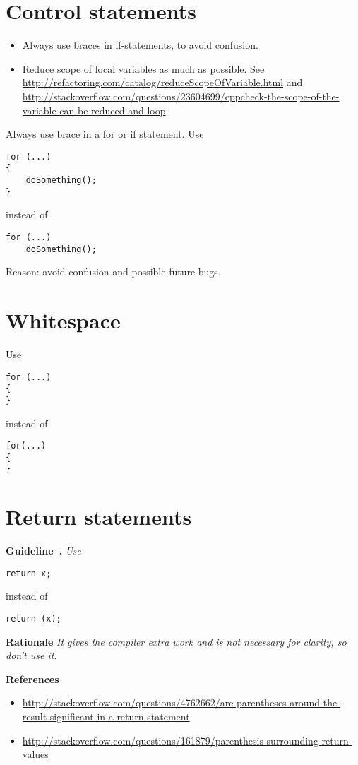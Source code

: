 \documentclass{article}
\newcounter{guideline}
\newenvironment{guideline}[1][]{\refstepcounter{guideline}\par\medskip
   \noindent \textbf{Guideline~\theguideline. #1} \em \rmfamily}{\medskip}
\newenvironment{rationale}{\par\medskip
   \noindent \textbf{Rationale} \em \rmfamily}{\medskip}
\newenvironment{references}{\par\medskip
   \noindent \textbf{References} \em \rmfamily \begin{itemize}}{\end{itemize}\medskip}
\begin{document}
\section{Control statements}

\begin{itemize}
\item Always use braces in if-statements, to avoid confusion.
\item Reduce scope of local variables as much as possible.  See \url{http://refactoring.com/catalog/reduceScopeOfVariable.html} and \url{http://stackoverflow.com/questions/23604699/cppcheck-the-scope-of-the-variable-can-be-reduced-and-loop}.
\end{itemize}

Always use brace in a for or if statement.  Use
\begin{lstlisting}
for (...)
{
    doSomething();
}
\end{lstlisting}
instead of
\begin{lstlisting}
for (...)
    doSomething();
\end{lstlisting}
Reason: avoid confusion and possible future bugs.

\section{Whitespace}
Use
\begin{lstlisting}
for (...)
{
}
\end{lstlisting}
instead of
\begin{lstlisting}
for(...)
{
}
\end{lstlisting}


\section{Return statements}

\begin{guideline}
Use
\begin{lstlisting}
return x;
\end{lstlisting}
instead of
\begin{lstlisting}
return (x);
\end{lstlisting}
\begin{rationale}
It gives the compiler extra work and is not necessary for clarity, so don't use it.
\end{rationale}
\begin{references}
\item \url{http://stackoverflow.com/questions/4762662/are-parentheses-around-the-result-significant-in-a-return-statement}
\item \url{http://stackoverflow.com/questions/161879/parenthesis-surrounding-return-values}
\end{references}
\end{guideline}
\end{document}
